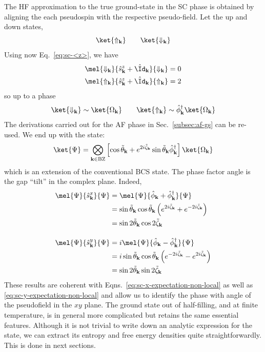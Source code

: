 The HF approximation to the true ground-state in the SC phase is obtained by aligning the each pseudospin with the respective pseudo-field. Let the up and down states,
\[
	\ket{\Uparrow_\mathbf{k}}
	\qquad
	\ket{\Downarrow_\mathbf{k}}
\]
Using now Eq.~\eqref{eq:sc-<z>}, we have
\[
\begin{aligned}
	\mel{\Downarrow_\mathbf{k}}{\hat s_\mathbf{k}^z + \hat \Id_\mathbf{k}}{\Downarrow_\mathbf{k}} &= 0 \\
	\mel{\Uparrow_\mathbf{k}}{\hat s_\mathbf{k}^z + \hat \Id_\mathbf{k}}{\Uparrow_\mathbf{k}} &= 2
\end{aligned}
\]
so up to a phase
\[
	\ket{\Downarrow_\mathbf{k}} \sim \ket{\Omega_\mathbf{k}}
	\qquad
	\ket{\Uparrow_\mathbf{k}} \sim \hat \phi_\mathbf{k}^\dagger \ket{\Omega_\mathbf{k}}
\]
The derivations carried out for the AF phase in Sec.~\ref{subsec:af-gs} can be re-used. We end up with the state:
\[
	\ket{\Psi} = \bigotimes_{\mathbf{k}\in\mathrm{BZ}} \left[
		\cos \tilde{\theta}_\mathbf{k} + e^{2i\tilde{\zeta}_\mathbf{k}} \sin \tilde{\theta}_\mathbf{k} \hat \phi_\mathbf{k}^\dagger
	\right] \ket{\Omega_\mathbf{k}}
\]
which is an extension of the conventional BCS state. The phase factor angle is the gap ``tilt'' in the complex plane. Indeed,
\[
\begin{aligned}
	\mel{\Psi}{\hat s_\mathbf{k}^x}{\Psi} &= \mel{\Psi}{\hat \phi_\mathbf{k} + \hat \phi_\mathbf{k}^\dagger}{\Psi} \\
	&= \sin \tilde{\theta}_\mathbf{k} \cos \tilde{\theta}_\mathbf{k} \left(
		e^{2i \tilde{\zeta}_\mathbf{k}} + e^{-2i \tilde{\zeta}_\mathbf{k}}
	\right) \\
	&= \sin 2\tilde{\theta}_\mathbf{k} \cos 2 \tilde{\zeta}_\mathbf{k} \\[1em]
	\mel{\Psi}{\hat s_\mathbf{k}^y}{\Psi} &= i \mel{\Psi}{\hat \phi_\mathbf{k} - \hat \phi_\mathbf{k}^\dagger}{\Psi} \\
	&= i \sin \tilde{\theta}_\mathbf{k} \cos \tilde{\theta}_\mathbf{k} \left(
	e^{-2i \tilde{\zeta}_\mathbf{k}} - e^{2i \tilde{\zeta}_\mathbf{k}}
	\right) \\
	&= \sin 2\tilde{\theta}_\mathbf{k} \sin 2 \tilde{\zeta}_\mathbf{k}
\end{aligned}
\]
These results are coherent with Eqns.~\eqref{eq:sc-x-expectation-non-local} as well as \eqref{eq:sc-y-expectation-non-local} and allow us to identify the phase with angle of the pseudofield in the $xy$ plane. The ground state out of half-filling, and at finite temperature, is in general more complicated but retains the same essential features. Although it is not trivial to write down an analytic expression for the state, we can extract its entropy and free energy densities quite straightforwardly. This is done in next sections.


